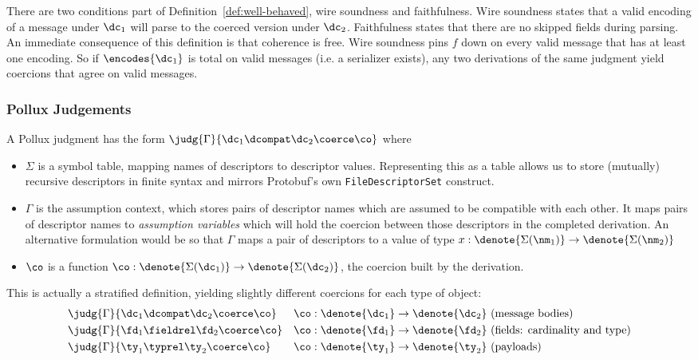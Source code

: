 There are two conditions part of Definition~\ref{def:well-behaved}, wire
soundness and faithfulness. Wire soundness states that a valid encoding of a
message under $\dc_1$ will parse to the coerced version under $\dc_2$. Faithfulness
states that there are no skipped fields during parsing.  An immediate
consequence of this definition is that coherence is free. Wire soundness pins
$f$ down on every valid message that has at least one encoding. So if
$\encodes{\dc_1}$ is total on valid messages (i.e. a serializer exists), any two
derivations of the same judgment yield coercions that agree on valid messages.

\subsubsection{Pollux Judgements}

A Pollux judgment has the form $\judg{\Gamma}{\dc_1 \dcompat \dc_2 \coerce \co}$ where
\begin{itemize}
\item $\Sigma$ is a symbol table, mapping names of descriptors to descriptor
  values. Representing this as a table allows us to store (mutually) recursive
  descriptors in finite syntax and mirrors Protobuf's own
  \texttt{FileDescriptorSet} construct.
\item $\Gamma$ is the assumption context, which stores pairs of descriptor names
  which are assumed to be compatible with each other. It maps pairs of
  descriptor names to \emph{assumption variables} which will hold the coercion
  between those descriptors in the completed derivation. An alternative
  formulation would be so that $\Gamma$ maps a pair of descriptors to a value of type
  $x : \denote{\Sigma(\nm_1)} \rightarrow \denote{\Sigma(\nm_2)}$ 
\item $\co$ is a function $\co : \denote{\Sigma(\dc_1)} \rightarrow \denote{\Sigma(\dc_2)}$, the coercion
  built by the derivation.
\end{itemize}

This is actually a stratified definition, yielding slightly different coercions
for each type of object:
\begin{align*}
  &\judg{\Gamma}{\dc_1 \dcompat \dc_2 \coerce \co}
  && \co : \denote{\dc_1} \to \denote{\dc_2} \text{ (message bodies)} \\
  &\judg{\Gamma}{\fd_1 \fieldrel \fd_2 \coerce \co}
  && \co : \denote{\fd_1} \to \denote{\fd_2} \text{ (fields: cardinality and type)} \\
  &\judg{\Gamma}{\ty_1 \typrel \ty_2 \coerce \co}
  && \co : \denote{\ty_1} \to \denote{\ty_2} \text{ (payloads)}
\end{align*}

